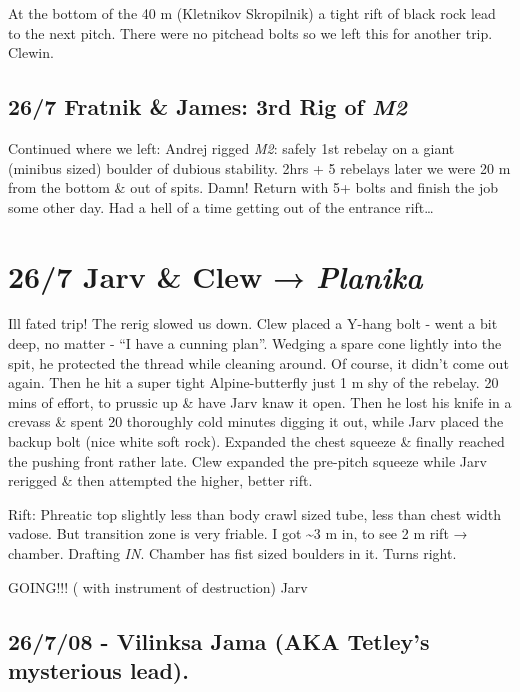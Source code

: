 At the bottom of the 40 m (Kletnikov Skropilnik) a tight rift of black
rock lead to the next pitch. There were no pitchead bolts so we left
this for another trip. Clewin.

\hypertarget{fratnik-james-3rd-rig-of-m2}{%
\subsection{\texorpdfstring{26/7 Fratnik \& James: 3rd Rig of
\emph{M2}}{26/7 Fratnik \& James: 3rd Rig of M2}}\label{fratnik-james-3rd-rig-of-m2}}

Continued where we left: Andrej rigged \emph{M2}: safely 1st rebelay on
a giant (minibus sized) boulder of dubious stability. 2hrs + 5 rebelays
later we were 20 m from the bottom \& out of spits. Damn! Return with 5+
bolts and finish the job some other day. Had a hell of a time getting
out of the entrance rift\ldots{}

\hypertarget{jarv-clew-planika}{%
\section{\texorpdfstring{26/7 Jarv \& Clew →
\emph{Planika}}{26/7 Jarv \& Clew → Planika}}\label{jarv-clew-planika}}

Ill fated trip! The rerig slowed us down. Clew placed a Y-hang bolt -
went a bit deep, no matter - ``I have a cunning plan''. Wedging a spare
cone lightly into the spit, he protected the thread while cleaning
around. Of course, it didn't come out again. Then he hit a super tight
Alpine-butterfly just 1 m shy of the rebelay. 20 mins of effort, to
prussic up \& have Jarv knaw it open. Then he lost his knife in a
crevass \& spent 20 thoroughly cold minutes digging it out, while Jarv
placed the backup bolt (nice white soft rock). Expanded the chest
squeeze \& finally reached the pushing front rather late. Clew expanded
the pre-pitch squeeze while Jarv rerigged \& then attempted the higher,
better rift.

Rift: Phreatic top slightly less than body crawl sized tube, less than
chest width vadose. But transition zone is very friable. I got
\textasciitilde3 m in, to see 2 m rift → chamber. Drafting \emph{IN}.
Chamber has fist sized boulders in it. Turns right.

GOING!!! ( with instrument of destruction) Jarv

\hypertarget{vilinksa-jama-aka-tetleys-mysterious-lead.}{%
\subsection{26/7/08 - Vilinksa Jama (AKA Tetley's mysterious
lead).}\label{vilinksa-jama-aka-tetleys-mysterious-lead.}}

